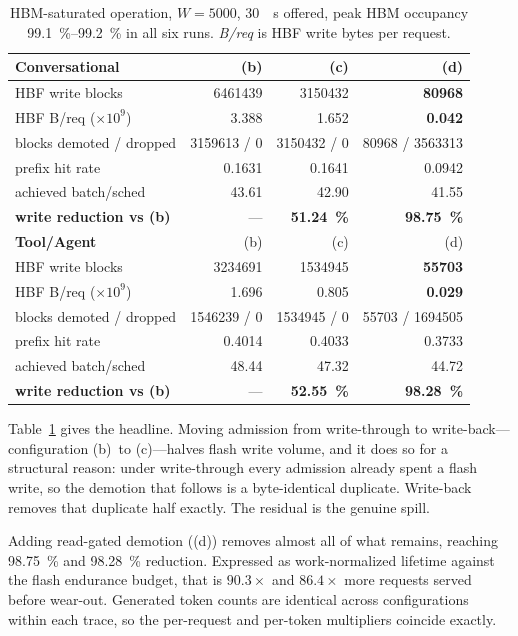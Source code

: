 \documentclass[conference]{IEEEtran}
\newcommand{\cfgb}{\textsf{(b)}}
\newcommand{\cfgc}{\textsf{(c)}}
\newcommand{\cfgd}{\textsf{(d)}}
\begin{document}
\begin{table}[t]
\centering
\caption{HBM-saturated operation, $W=\num{5000}$, \SI{30}{\per\second} offered,
peak HBM occupancy \SIrange{99.1}{99.2}{\percent} in all six runs.
\emph{B/req} is HBF write bytes per request.}
\label{tab:headline}
\small
\begin{tabular}{lrrr}
\toprule
\textbf{Conversational} & \cfgb & \cfgc & \cfgd \\
\midrule
HBF write blocks      & \num{6461439} & \num{3150432} & \textbf{\num{80968}} \\
HBF B/req ($\times 10^9$) & 3.388 & 1.652 & \textbf{0.042} \\
blocks demoted / dropped & \num{3159613} / 0 & \num{3150432} / 0 & \num{80968} / \num{3563313} \\
prefix hit rate       & 0.1631 & 0.1641 & 0.0942 \\
achieved batch/sched  & 43.61 & 42.90 & 41.55 \\
\textbf{write reduction vs \cfgb} & --- & \textbf{\SI{51.24}{\percent}} & \textbf{\SI{98.75}{\percent}} \\
\midrule
\textbf{Tool/Agent} & \cfgb & \cfgc & \cfgd \\
\midrule
HBF write blocks      & \num{3234691} & \num{1534945} & \textbf{\num{55703}} \\
HBF B/req ($\times 10^9$) & 1.696 & 0.805 & \textbf{0.029} \\
blocks demoted / dropped & \num{1546239} / 0 & \num{1534945} / 0 & \num{55703} / \num{1694505} \\
prefix hit rate       & 0.4014 & 0.4033 & 0.3733 \\
achieved batch/sched  & 48.44 & 47.32 & 44.72 \\
\textbf{write reduction vs \cfgb} & --- & \textbf{\SI{52.55}{\percent}} & \textbf{\SI{98.28}{\percent}} \\
\bottomrule
\end{tabular}
\end{table}

Table~\ref{tab:headline} gives the headline. Moving admission from write-through
to write-back---configuration \cfgb\ to \cfgc---halves flash write volume, and it
does so for a structural reason: under write-through every admission already
spent a flash write, so the demotion that follows is a byte-identical duplicate.
Write-back removes that duplicate half exactly. The residual is the genuine
spill.

Adding read-gated demotion (\cfgd) removes almost all of what remains, reaching
\SI{98.75}{\percent} and \SI{98.28}{\percent} reduction. Expressed as
work-normalized lifetime against the flash endurance budget, that is
$\mathbf{90.3\times}$ and $\mathbf{86.4\times}$ more requests served before
wear-out. Generated token counts are identical across configurations within each
trace, so the per-request and per-token multipliers coincide exactly.
\end{document}
